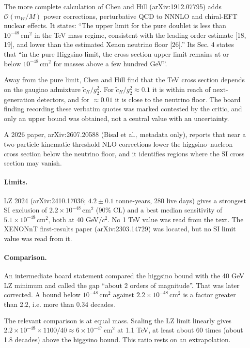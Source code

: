 \documentclass[11pt,a4paper]{article}
\begin{document}
The more complete calculation of Chen and Hill (arXiv:1912.07795) adds $\mathcal{O}(m_W/M)$ power corrections, perturbative QCD to NNNLO and chiral-EFT nuclear effects. It states: ``The upper limit for the pure doublet is less than $10^{-48}\,\mathrm{cm^2}$ in the TeV mass regime, consistent with the leading order estimate [18, 19], and lower than the estimated Xenon neutrino floor [26].'' Its Sec. 4 states that ``in the pure Higgsino limit, the cross section upper limit remains at or below $10^{-48}\,\mathrm{cm^2}$ for masses above a few hundred GeV''.

Away from the pure limit, Chen and Hill find that the TeV cross section depends on the gaugino admixture $\tilde c_H/g_2^2$. For $\tilde c_H/g_2^2\approx 0.1$ it is within reach of next-generation detectors, and for $\approx 0.01$ it is close to the neutrino floor. The board finding recording these verbatim quotes was marked contested by the critic, and only an upper bound was obtained, not a central value with an uncertainty.

A 2026 paper, arXiv:2607.20588 (Bisal et al., metadata only), reports that near a two-particle kinematic threshold NLO corrections lower the higgsino--nucleon cross section below the neutrino floor, and it identifies regions where the SI cross section may vanish.

\paragraph{Limits.} LZ 2024 (arXiv:2410.17036; $4.2\pm0.1$ tonne-years, 280 live days) gives a strongest SI exclusion of $2.2\times10^{-48}\,\mathrm{cm^2}$ (90\% CL) and a best median sensitivity of $5.1\times10^{-48}\,\mathrm{cm^2}$, both at 40 GeV$/c^2$. No 1 TeV value was read from the text. The XENONnT first-results paper (arXiv:2303.14729) was located, but no SI limit value was read from it.

\paragraph{Comparison.} An intermediate board statement compared the higgsino bound with the 40 GeV LZ minimum and called the gap ``about 2 orders of magnitude''. That was later corrected. A bound below $10^{-48}\,\mathrm{cm^2}$ against $2.2\times10^{-48}\,\mathrm{cm^2}$ is a factor greater than 2.2, i.e. more than 0.34 decades.

The relevant comparison is at equal mass. Scaling the LZ limit linearly gives $2.2\times10^{-48}\times1100/40 \approx 6\times10^{-47}\,\mathrm{cm^2}$ at 1.1 TeV, at least about 60 times (about 1.8 decades) above the higgsino bound. This ratio rests on an extrapolation.
\end{document}

